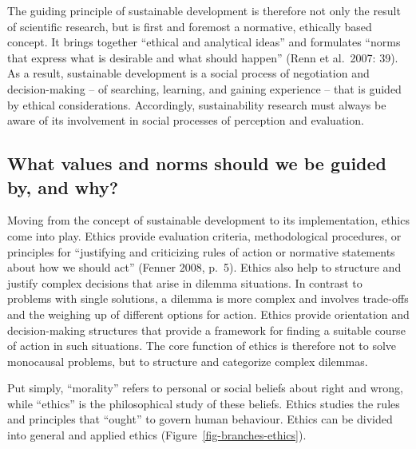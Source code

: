 \documentclass[
  a4paper,
  openany]{book}
\begin{document}
The guiding principle of sustainable development is therefore not only
the result of scientific research, but is first and foremost a
normative, ethically based concept. It brings together ``ethical and
analytical ideas'' and formulates ``norms that express what is desirable
and what should happen'' (Renn et al.~2007: 39). As a result,
sustainable development is a social process of negotiation and
decision-making -- of searching, learning, and gaining experience --
that is guided by ethical considerations. Accordingly, sustainability
research must always be aware of its involvement in social processes of
perception and evaluation.

\subsection{What values and norms should we be guided by, and
why?}\label{what-values-and-norms-should-we-be-guided-by-and-why}

Moving from the concept of sustainable development to its
implementation, ethics come into play. Ethics provide evaluation
criteria, methodological procedures, or principles for ``justifying and
criticizing rules of action or normative statements about how we should
act'' (Fenner 2008, p.~5). Ethics also help to structure and justify
complex decisions that arise in dilemma situations. In contrast to
problems with single solutions, a dilemma is more complex and involves
trade-offs and the weighing up of different options for action. Ethics
provide orientation and decision-making structures that provide a
framework for finding a suitable course of action in such situations.
The core function of ethics is therefore not to solve monocausal
problems, but to structure and categorize complex dilemmas.

Put simply, ``morality'' refers to personal or social beliefs about
right and wrong, while ``ethics'' is the philosophical study of these
beliefs. Ethics studies the rules and principles that ``ought'' to
govern human behaviour. Ethics can be divided into general and applied
ethics (Figure~\ref{fig-branches-ethics}).
\end{document}
